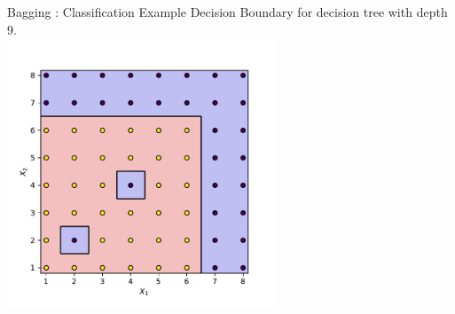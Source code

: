 \documentclass{beamer}
\begin{document}
	\begin{frame}{Bagging : Classification Example}
	Decision Boundary for decision tree with depth 9.\\
	\vspace{0.5cm}
	\centering
	\includegraphics[width = 0.6\textwidth]{strong-tree}
	\end{frame}
	
\end{document}
